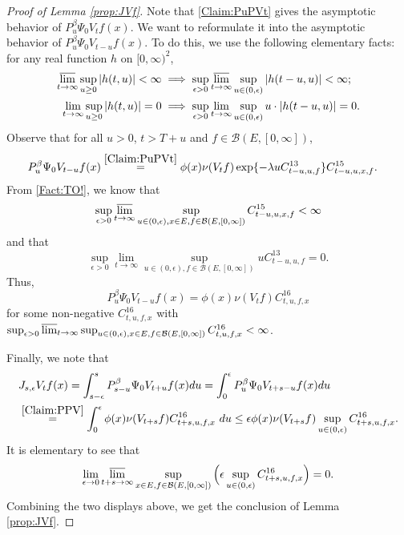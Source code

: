\documentclass[12pt,a4paper]{amsart}
\numberwithin{equation}{section}
\theoremstyle{plain}
\theoremstyle{definition}
\theoremstyle{remark}
\begin{document}
\begin{proof}[Proof of Lemma \ref{prop:JVf}]
	
	Note that \eqref{Claim:PuPVt} gives the asymptotic behavior of $P_u^\beta \Psi_0 V_t f(x)$.
	We want to reformulate it into the asymptotic behavior  of $P_u^\beta \Psi_0 V_{t-u} f(x)$.	
	To do this, we use the following elementary facts: for any real function $h$ on $[0,\infty)^2$,
\begin{align}\label{Fact:TO!}
	\varlimsup_{t\to \infty} \sup_{u\geq 0} |h(t,u)| < \infty & \implies \sup_{\epsilon > 0} \varlimsup_{t\to \infty} \sup_{u \in (0,\epsilon)} |h(t-u,u)| < \infty;
	\\ 	\lim_{t\to \infty} \sup_{u \geq 0} |h(t,u)| = 0 & \implies \sup_{\epsilon > 0} \lim_{t\to \infty} \sup_{u \in (0,\epsilon)} u\cdot |h(t-u,u)| = 0.
\end{align}
	Observe that for all $u>0$, $t> T + u$ and $f \in \mathcal B(E,[0,\infty])$,
\begin{align}
	& P_u^\beta \Psi_0 V_{t-u} f(x)
	\overset{\eqref{Claim:PuPVt}}= \phi(x) \nu(V_{t}f)
	\exp\{-\lambda u C^{13}_{t-u,u,f} \} C^{15}_{t-u,u,x,f}.
\end{align}
	From \eqref{Fact:TO!}, we know that
\[
	\sup_{\epsilon > 0}\varlimsup_{t\to \infty}
	\sup_{u\in (0,\epsilon), x\in E, f \in \mathcal B(E,[0,\infty])}
	C^{15}_{t-u,u,x,f} < \infty
\]
	and that
\[
	\sup_{\epsilon > 0}\lim_{t\to \infty}
	\sup_{u\in (0,\epsilon), f \in \mathcal B(E,[0,\infty])}
       uC^{13}_{t-u,u,f} =0.
\]
	Thus,
\begin{equation}
	\label{Claim:PPV}
	P_u^\beta \Psi_0 V_{t-u} f(x)
	= \phi(x)\nu(V_tf) C^{16}_{t,u,f,x}
	\end{equation}
for some non-negative $C^{16}_{t, u,f,x}$ with $\sup_{\epsilon > 0} \varlimsup_{t\to \infty}
\sup_{u \in (0,\epsilon), x\in E, f \in \mathcal B(E,[0,\infty])} C^{16}_{t,u,f,x} < \infty$.
	

	Finally, we note that
\begin{align}
	&J_{s,\epsilon}V_tf(x) = \int_{s-\epsilon}^s P_{s-u}^\beta \Psi_0 V_{t+u} f(x)du
	= \int_0^\epsilon P_u^\beta \Psi_0 V_{t+s - u}f(x) du
	\\& \overset{\eqref{Claim:PPV}}= \int_0^\epsilon \phi(x) \nu(V_{t+s}f) C^{16}_{t+s,u,f,x}~du
	\leq \epsilon \phi(x)\nu(V_{t+s}f) \sup_{u\in (0,\epsilon)} C^{16}_{t+s,u,f,x}.
	\end{align}
	It is elementary to see that \[\lim_{\epsilon \to 0}\varlimsup_{t+s \to \infty}
	\sup_{x\in E, f \in \mathcal B(E,[0,\infty])}
		\Big(\epsilon \sup_{u\in (0,\epsilon)} C^{16}_{t+s,u,f,x}\Big) = 0.\]
		Combining the two displays above, we get the conclusion of Lemma \ref{prop:JVf}.
		\end{proof}
\end{document}
